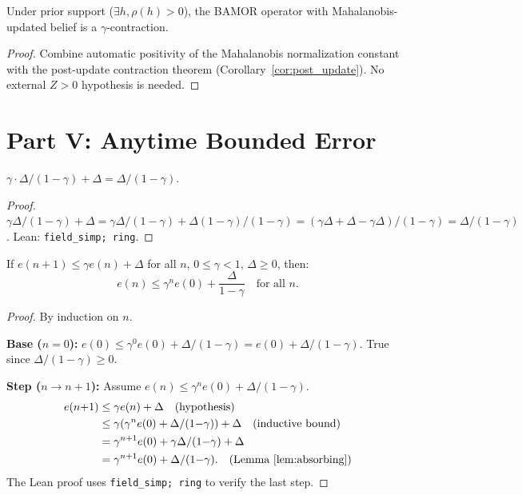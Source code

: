 \begin{theorem}
Under prior support ($\exists h, \rho(h) > 0$), the BAMOR operator with Mahalanobis-updated belief is a $\gamma$-contraction.
\end{theorem}
\begin{proof}
Combine automatic positivity of the Mahalanobis normalization constant with the post-update contraction theorem (Corollary~\ref{cor:post_update}).  No external $Z > 0$ hypothesis is needed.
\end{proof}


\section{Part V: Anytime Bounded Error}
\label{app:anytime}

\begin{lemma}
\label{lem:absorbing}
$\gamma \cdot \Delta/(1{-}\gamma) + \Delta = \Delta/(1{-}\gamma)$.
\end{lemma}
\begin{proof}
$\gamma\Delta/(1{-}\gamma) + \Delta = \gamma\Delta/(1{-}\gamma) + \Delta(1{-}\gamma)/(1{-}\gamma) = (\gamma\Delta + \Delta - \gamma\Delta)/(1{-}\gamma) = \Delta/(1{-}\gamma)$.  Lean: \texttt{field\_simp; ring}.
\end{proof}

\begin{theorem}
\label{thm:anytime}
If $e(n{+}1) \le \gamma e(n) + \Delta$ for all $n$, $0 \le \gamma < 1$, $\Delta \ge 0$, then:
\begin{equation}
    e(n) \le \gamma^n e(0) + \frac{\Delta}{1{-}\gamma} \quad \text{for all } n.
\end{equation}
\end{theorem}
\begin{proof}
By induction on $n$.

\textbf{Base ($n = 0$):} $e(0) \le \gamma^0 e(0) + \Delta/(1{-}\gamma) = e(0) + \Delta/(1{-}\gamma)$.  True since $\Delta/(1{-}\gamma) \ge 0$.

\textbf{Step ($n \to n{+}1$):} Assume $e(n) \le \gamma^n e(0) + \Delta/(1{-}\gamma)$.
\begin{align}
    e(n{+}1) &\le \gamma e(n) + \Delta \quad \text{(hypothesis)} \\
    &\le \gamma(\gamma^n e(0) + \Delta/(1{-}\gamma)) + \Delta \quad \text{(inductive bound)} \\
    &= \gamma^{n+1} e(0) + \gamma\Delta/(1{-}\gamma) + \Delta \\
    &= \gamma^{n+1} e(0) + \Delta/(1{-}\gamma). \quad \text{(Lemma~\ref{lem:absorbing})}
\end{align}
The Lean proof uses \texttt{field\_simp; ring} to verify the last step.
\end{proof}

